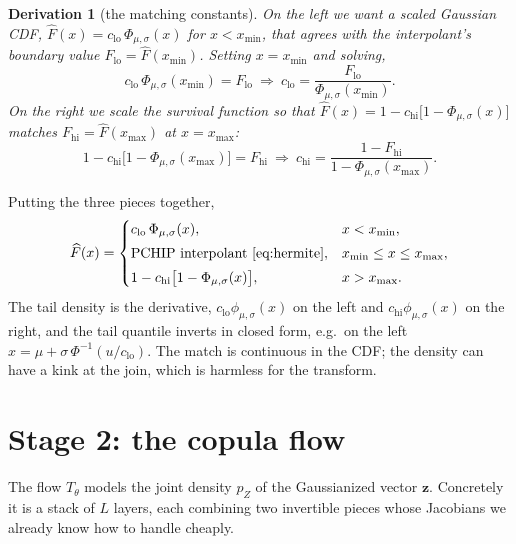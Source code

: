 \documentclass[11pt]{article}
\newcommand{\z}{\bm{z}}
\newcommand{\Fhat}{\widehat{F}}
\newtheorem*{deriv}{Derivation}
\theoremstyle{remark}
\begin{document}
\begin{deriv}[the matching constants]
On the left we want a scaled Gaussian CDF, $\Fhat(x)=c_{\mathrm{lo}}\,
\Phi_{\mu,\sigma}(x)$ for $x<x_{\min}$, that agrees with the interpolant's
boundary value $F_{\mathrm{lo}}=\Fhat(x_{\min})$. Setting $x=x_{\min}$ and solving,
\begin{equation}
c_{\mathrm{lo}}\,\Phi_{\mu,\sigma}(x_{\min})=F_{\mathrm{lo}}
\ \Longrightarrow\
c_{\mathrm{lo}}=\frac{F_{\mathrm{lo}}}{\Phi_{\mu,\sigma}(x_{\min})}.
\end{equation}
On the right we scale the \emph{survival} function so that
$\Fhat(x)=1-c_{\mathrm{hi}}\bigl[1-\Phi_{\mu,\sigma}(x)\bigr]$ matches
$F_{\mathrm{hi}}=\Fhat(x_{\max})$ at $x=x_{\max}$:
\begin{equation}
1-c_{\mathrm{hi}}\bigl[1-\Phi_{\mu,\sigma}(x_{\max})\bigr]=F_{\mathrm{hi}}
\ \Longrightarrow\
c_{\mathrm{hi}}=\frac{1-F_{\mathrm{hi}}}{1-\Phi_{\mu,\sigma}(x_{\max})}.
\end{equation}
\end{deriv}

\noindent Putting the three pieces together,
\begin{equation}
\label{eq:tail-cdf}
\Fhat(x)=
\begin{cases}
c_{\mathrm{lo}}\,\Phi_{\mu,\sigma}(x), & x<x_{\min},\\[3pt]
\text{PCHIP interpolant \eqref{eq:hermite}}, & x_{\min}\le x\le x_{\max},\\[3pt]
1-c_{\mathrm{hi}}\bigl[1-\Phi_{\mu,\sigma}(x)\bigr], & x>x_{\max}.
\end{cases}
\end{equation}
The tail density is the derivative, $c_{\mathrm{lo}}\phi_{\mu,\sigma}(x)$ on the
left and $c_{\mathrm{hi}}\phi_{\mu,\sigma}(x)$ on the right, and the tail quantile
inverts in closed form, e.g.\ on the left
$x=\mu+\sigma\,\Phi^{-1}(u/c_{\mathrm{lo}})$. The match is continuous in the CDF;
the density can have a kink at the join, which is harmless for the transform.

\section{Stage 2: the copula flow}
\label{sec:copula-flow}

The flow $T_\theta$ models the joint density $p_Z$ of the Gaussianized vector
$\z$. Concretely it is a stack of $L$ layers, each combining two invertible
pieces whose Jacobians we already know how to handle cheaply.
\end{document}
